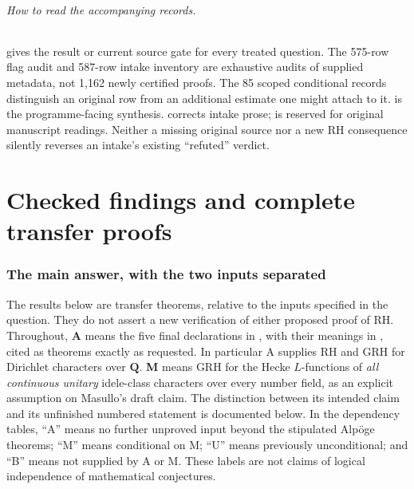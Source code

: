 \documentclass[11pt,a4paper]{article}
\theoremstyle{definition}
\begin{document}
\paragraph{How to read the accompanying records.}
 gives the result or current source gate for every
treated question. The 575-row flag audit and 587-row intake inventory are
exhaustive audits of supplied metadata, not 1,162 newly certified proofs.
The 85 scoped conditional records distinguish an original row from an
additional estimate one might attach to it.  is the
programme-facing synthesis.  corrects intake
prose;  is reserved for original manuscript
readings. Neither a missing original source nor a new RH consequence
silently reverses an intake's existing ``refuted'' verdict.

\begingroup\small\setlength{\parskip}{0pt}
\tableofcontents
\endgroup
\clearpage
\part{Checked findings and complete transfer proofs}


\section{The main answer, with the two inputs separated}
\label{sec:main-answer}

The results below are transfer theorems, relative to the inputs specified in
the question.  They do not assert a new verification of either proposed
proof of RH.  Throughout, \textbf{A} means the five final declarations in
, with their meanings in
, cited as theorems exactly as requested.
In particular A supplies RH and GRH for Dirichlet characters over
$\mathbf Q$.  \textbf{M} means GRH for the Hecke $L$-functions of
\emph{all continuous unitary} idele-class characters over every number
field, as an explicit assumption on Masullo's draft claim.  The distinction
between its intended claim and its unfinished numbered statement is
documented below.  In the dependency tables, ``A'' means no further
unproved input beyond the stipulated Alp\"oge theorems; ``M'' means
conditional on M; ``U'' means previously unconditional; and ``B'' means
not supplied by A or M.  These labels are not claims of logical
independence of mathematical conjectures.
\end{document}
